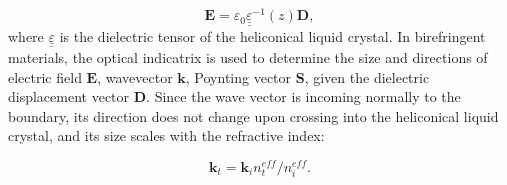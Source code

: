 \documentclass{osa-article}
\renewcommand{\vec}[1]{\mathbf{#1}}
\begin{document}
\begin{equation}
\vec{E} = \varepsilon_0 \underline{\underline{\varepsilon}}^{-1}(z) \vec{D},
\end{equation}
where $\underline{\underline{\varepsilon}}$ is the dielectric tensor of the heliconical liquid crystal. 
In birefringent materials, the optical indicatrix is used to determine the size and directions of electric field $\vec{E}$, wavevector $\vec{k}$, Poynting vector $\vec{S}$, given the dielectric displacement vector $\vec{D}$. 
Since the wave vector is incoming normally to the boundary, its direction does not change upon crossing into the heliconical liquid crystal,
and its size scales with the refractive index: 

\begin{equation}
\vec{k}_t = \vec{k}_i n^{eff}_t/n^{eff}_i.
\end{equation}
\end{document}
